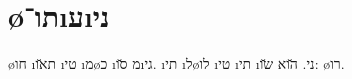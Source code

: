 \section*{\o{תו}־\i{ע}\i{ני}}

\o{חו} \i{ת}\u{או} \i{טי} \i{מ}\o{כ} \i{מ} \u{סו}\i{גי}. \i{תי} \i{ל}\o{לו}  \i{טי} \i{תי}  \i{ני}.   \u{הוא} \u{שו}:   \o{רו}.

\tableofcontents
